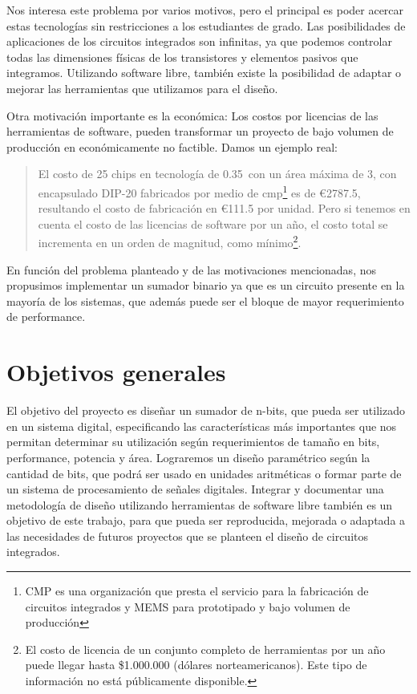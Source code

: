 Nos interesa este problema por varios motivos, pero el principal es poder acercar estas tecnologías sin restricciones a los estudiantes de grado. Las posibilidades de aplicaciones de los circuitos integrados son infinitas, ya que podemos controlar todas las dimensiones físicas de los transistores y elementos pasivos que integramos. Utilizando software libre, también existe la posibilidad de adaptar o mejorar las herramientas que utilizamos para el diseño.

Otra motivación importante es la económica: Los costos por licencias de las herramientas de software, pueden transformar un proyecto de bajo volumen de producción en económicamente no factible. Damos un ejemplo real: 

\begin{quote}
El costo de 25 chips en tecnología de 0.35~\microm con un área máxima de 3\mmcuadrado, con encapsulado DIP-20 fabricados por medio de \gls{cmp}\footnote{CMP es una organización que presta el servicio para la fabricación de circuitos integrados y MEMS para prototipado y bajo volumen de producción} es de \euro{2787.5}, resultando el costo de fabricación en \euro{111.5} por unidad. Pero si tenemos en cuenta el costo de las licencias de software por un año, el costo total se incrementa en un orden de magnitud, como mínimo\footnote{El costo de licencia de un conjunto completo de herramientas por un año puede llegar hasta \$1.000.000 (dólares norteamericanos). Este tipo de información no está públicamente disponible.}.
\end{quote}

En función del problema planteado y de las motivaciones mencionadas, nos propusimos implementar un sumador binario ya que es un circuito presente en la mayoría de los sistemas, que además puede ser el bloque de mayor requerimiento de performance.
\section{Objetivos generales}

El objetivo del proyecto es diseñar un sumador de n-bits, que pueda ser utilizado en un sistema digital, especificando las características más importantes que nos permitan determinar su utilización según requerimientos de tamaño en bits, performance, potencia y área. Lograremos un diseño paramétrico según la cantidad de bits, que podrá ser usado en unidades aritméticas o formar parte de un sistema de procesamiento de señales digitales. Integrar y documentar una metodología de diseño utilizando herramientas de software libre también es un objetivo de este trabajo, para que pueda ser reproducida, mejorada o adaptada a las necesidades de futuros proyectos que se planteen el diseño de circuitos integrados.


